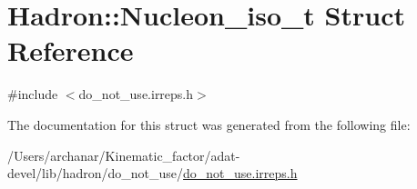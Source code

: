 \hypertarget{structHadron_1_1Nucleon__iso__t}{}\section{Hadron\+:\+:Nucleon\+\_\+iso\+\_\+t Struct Reference}
\label{structHadron_1_1Nucleon__iso__t}


{\ttfamily \#include $<$do\+\_\+not\+\_\+use.\+irreps.\+h$>$}



The documentation for this struct was generated from the following file\+:\begin{DoxyCompactItemize}
\item 
/\+Users/archanar/\+Kinematic\+\_\+factor/adat-\/devel/lib/hadron/do\+\_\+not\+\_\+use/\mbox{\hyperlink{adat-devel_2lib_2hadron_2do__not__use_2do__not__use_8irreps_8h}{do\+\_\+not\+\_\+use.\+irreps.\+h}}\end{DoxyCompactItemize}
